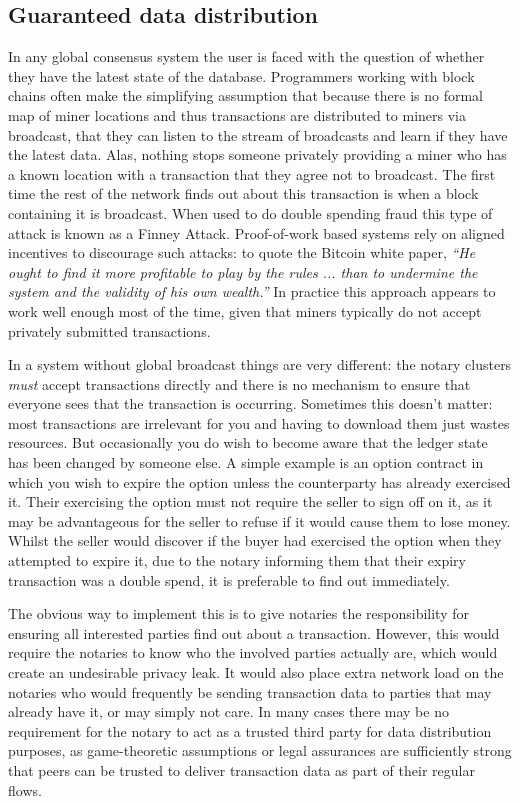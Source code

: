 \documentclass{article}
\begin{document}
\subsection{Guaranteed data distribution}

In any global consensus system the user is faced with the question of whether they have the latest state of the
database. Programmers working with block chains often make the simplifying assumption that because there is no
formal map of miner locations and thus transactions are distributed to miners via broadcast, that they can listen
to the stream of broadcasts and learn if they have the latest data. Alas, nothing stops someone privately providing
a miner who has a known location with a transaction that they agree not to broadcast. The first time the rest of
the network finds out about this transaction is when a block containing it is broadcast. When used to do double
spending fraud this type of attack is known as a Finney Attack\cite{FinneyAttack}. Proof-of-work based systems rely
on aligned incentives to discourage such attacks: to quote the Bitcoin white paper, \emph{``He ought to find it
more profitable to play by the rules ... than to undermine the system and the validity of his own wealth.''} In
practice this approach appears to work well enough most of the time, given that miners typically do not accept
privately submitted transactions.

In a system without global broadcast things are very different: the notary clusters \emph{must} accept transactions
directly and there is no mechanism to ensure that everyone sees that the transaction is occurring. Sometimes this
doesn't matter: most transactions are irrelevant for you and having to download them just wastes resources. But
occasionally you do wish to become aware that the ledger state has been changed by someone else. A simple example
is an option contract in which you wish to expire the option unless the counterparty has already exercised it. Their
exercising the option must not require the seller to sign off on it, as it may be advantageous for the seller to
refuse if it would cause them to lose money. Whilst the seller would discover if the buyer had exercised the option
when they attempted to expire it, due to the notary informing them that their expiry transaction was a double
spend, it is preferable to find out immediately.

The obvious way to implement this is to give notaries the responsibility for ensuring all interested parties find
out about a transaction. However, this would require the notaries to know who the involved parties actually are,
which would create an undesirable privacy leak. It would also place extra network load on the notaries who would
frequently be sending transaction data to parties that may already have it, or may simply not care. In many cases
there may be no requirement for the notary to act as a trusted third party for data distribution purposes, as
game-theoretic assumptions or legal assurances are sufficiently strong that peers can be trusted to deliver
transaction data as part of their regular flows.
\end{document}
